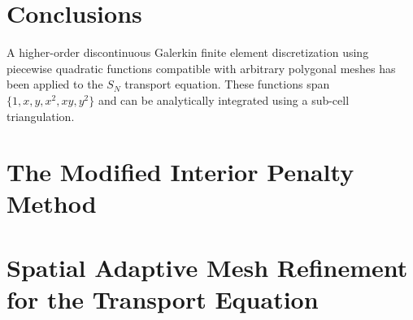 \documentclass[preprint,review,10pt]{elsarticle}
\begin{document}
\section{Conclusions} \label{sec::conclusions}

A higher-order discontinuous Galerkin finite element discretization using piecewise quadratic functions compatible with arbitrary polygonal meshes has been applied to the $S_N$ transport equation. These functions span $\{ 1,x,y,x^2,xy,y^2 \}$ and can be analytically integrated using a sub-cell triangulation.





\appendix
\section{The Modified Interior Penalty Method} \label{app::MIP}

\section{Spatial Adaptive Mesh Refinement for the Transport Equation} \label{app::AMR}
\end{document}
